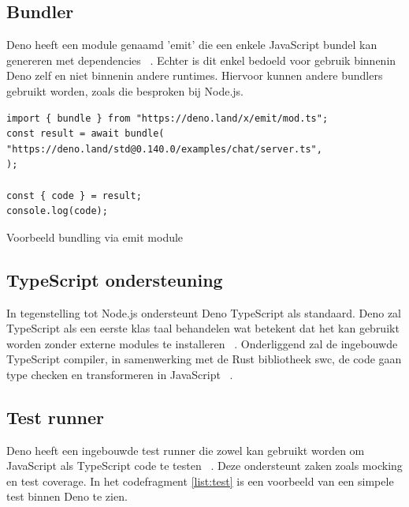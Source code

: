 \subsection{Bundler}
Deno heeft een module genaamd 'emit' die een enkele JavaScript bundel kan genereren met dependencies ~\autocite{DenoLand2023a}. 
Echter is dit enkel bedoeld voor gebruik binnenin Deno zelf en niet binnenin andere runtimes. 
Hiervoor kunnen andere bundlers gebruikt worden, zoals die besproken bij Node.js.

\begin{listing}[H]
    \centering
    \begin{verbatim}
import { bundle } from "https://deno.land/x/emit/mod.ts";
const result = await bundle(
"https://deno.land/std@0.140.0/examples/chat/server.ts",
);

const { code } = result;
console.log(code);
        \end{verbatim}
        \caption{\label{list:bundle}Voorbeeld bundling via emit module  ~\autocite{DenoLand2023a}} 
\end{listing}
\subsection{TypeScript ondersteuning}
In tegenstelling tot Node.js ondersteunt Deno TypeScript als standaard. 
Deno zal TypeScript als een eerste klas taal behandelen wat betekent dat het kan gebruikt worden zonder externe modules te installeren ~\autocite{DenoLand2023}.
Onderliggend zal de ingebouwde TypeScript compiler, in samenwerking met de Rust bibliotheek swc, 
de code gaan type checken en transformeren in JavaScript ~\autocite{DenoLand2023}.

\subsection{Test runner}
Deno heeft een ingebouwde test runner die zowel kan gebruikt worden om JavaScript als TypeScript code te testen ~\autocite{DenoLand2023}.
Deze ondersteunt zaken zoals mocking en test coverage. In het codefragment \ref{list:test} is een voorbeeld van een simpele test binnen Deno te zien.

